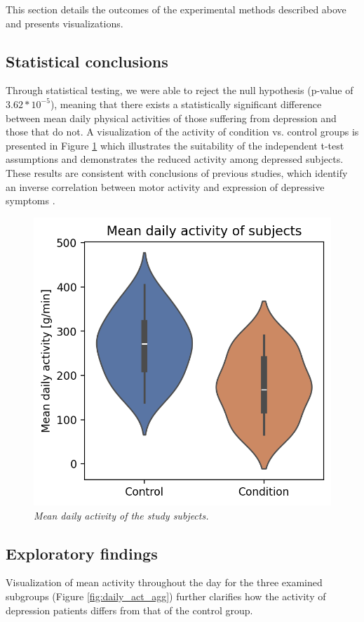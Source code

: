 \documentclass[12pt]{article}
\begin{document}
This section details the outcomes of the experimental methods described above and presents visualizations.

\subsection{Statistical conclusions}

Through statistical testing, we were able to reject the null hypothesis (p-value of $3.62 * 10^{-5}$), meaning that there exists a statistically significant difference between mean daily physical activities of those suffering from depression and those that do not. A visualization of the activity of condition vs. control groups is presented in Figure \ref{fig:act_violin} which illustrates the suitability of the independent t-test assumptions and demonstrates the reduced activity among depressed subjects. These results are consistent with conclusions of previous studies, which identify an inverse correlation between motor activity and expression of depressive symptoms \parencite{O_Brien, Pinto, Harris}. 

\begin{figure}[!ht]
    \centering
    \includegraphics[width=.5\textwidth]{images/act_violin.png}
    \captionsetup{justification=centering}
    \caption{\textit{Mean daily activity of the study subjects.}}
    \label{fig:act_violin}
\end{figure}

\subsection{Exploratory findings}

Visualization of mean activity throughout the day for the three examined subgroups (Figure \ref{fig:daily_act_agg}) further clarifies how the activity of depression patients differs from that of the control group. 
\end{document}
